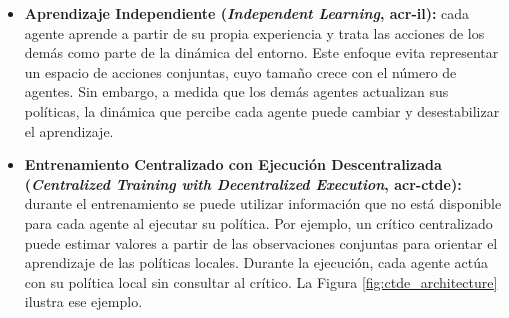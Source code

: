\begin{itemize}
    \item \textbf{Aprendizaje Independiente (\textit{Independent Learning}, \acrshort{acr-il}):} cada agente aprende a partir de su propia experiencia y trata las acciones de los demás como parte de la dinámica del entorno. Este enfoque evita representar un espacio de acciones conjuntas, cuyo tamaño crece con el número de agentes. Sin embargo, a medida que los demás agentes actualizan sus políticas, la dinámica que percibe cada agente puede cambiar y desestabilizar el aprendizaje.
    \item \textbf{Entrenamiento Centralizado con Ejecución Descentralizada (\textit{Centralized Training with Decentralized Execution}, \acrshort{acr-ctde}):} durante el entrenamiento se puede utilizar información que no está disponible para cada agente al ejecutar su política. Por ejemplo, un crítico centralizado puede estimar valores a partir de las observaciones conjuntas para orientar el aprendizaje de las políticas locales. Durante la ejecución, cada agente actúa con su política local sin consultar al crítico. La Figura \ref{fig:ctde_architecture} ilustra ese ejemplo.
\end{itemize}

